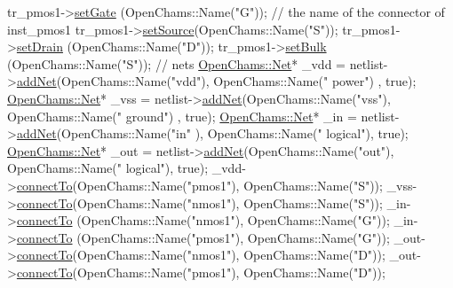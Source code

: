 \begin{DoxyCodeInclude}
    tr\_pmos1->\hyperlink{class_open_chams_1_1_transistor_a705b53a51f0e265533b228f6e8beaf50}{setGate}  (OpenChams::Name(\textcolor{stringliteral}{"G"})); \textcolor{comment}{// the name of the connector of inst\_pmos1}
    tr\_pmos1->\hyperlink{class_open_chams_1_1_transistor_abc4a5d86e639ea13e27551722e2f9c17}{setSource}(OpenChams::Name(\textcolor{stringliteral}{"S"}));
    tr\_pmos1->\hyperlink{class_open_chams_1_1_transistor_a72ff8491040e3fdc1c8bd62b2392ab82}{setDrain} (OpenChams::Name(\textcolor{stringliteral}{"D"}));
    tr\_pmos1->\hyperlink{class_open_chams_1_1_transistor_a1484abe63e3f8ffbc2911c5230fa7091}{setBulk}  (OpenChams::Name(\textcolor{stringliteral}{"S"}));
    \textcolor{comment}{//  nets}
    \hyperlink{class_open_chams_1_1_net}{OpenChams::Net}* \_vdd = netlist->\hyperlink{class_open_chams_1_1_netlist_a52be455a704925328843770552eca43d}{addNet}(OpenChams::Name(\textcolor{stringliteral}{"vdd"}), OpenChams::Name(\textcolor{stringliteral}{"
      power"})  , \textcolor{keyword}{true});
    \hyperlink{class_open_chams_1_1_net}{OpenChams::Net}* \_vss = netlist->\hyperlink{class_open_chams_1_1_netlist_a52be455a704925328843770552eca43d}{addNet}(OpenChams::Name(\textcolor{stringliteral}{"vss"}), OpenChams::Name(\textcolor{stringliteral}{"
      ground"}) , \textcolor{keyword}{true});
    \hyperlink{class_open_chams_1_1_net}{OpenChams::Net}* \_in  = netlist->\hyperlink{class_open_chams_1_1_netlist_a52be455a704925328843770552eca43d}{addNet}(OpenChams::Name(\textcolor{stringliteral}{"in"} ), OpenChams::Name(\textcolor{stringliteral}{"
      logical"}), \textcolor{keyword}{true});
    \hyperlink{class_open_chams_1_1_net}{OpenChams::Net}* \_out = netlist->\hyperlink{class_open_chams_1_1_netlist_a52be455a704925328843770552eca43d}{addNet}(OpenChams::Name(\textcolor{stringliteral}{"out"}), OpenChams::Name(\textcolor{stringliteral}{"
      logical"}), \textcolor{keyword}{true});
    \_vdd->\hyperlink{class_open_chams_1_1_net_a40c2c019175ba3bfa4b90f4ad5d06483}{connectTo}(OpenChams::Name(\textcolor{stringliteral}{"pmos1"}), OpenChams::Name(\textcolor{stringliteral}{"S"}));
    \_vss->\hyperlink{class_open_chams_1_1_net_a40c2c019175ba3bfa4b90f4ad5d06483}{connectTo}(OpenChams::Name(\textcolor{stringliteral}{"nmos1"}), OpenChams::Name(\textcolor{stringliteral}{"S"}));
    \_in->\hyperlink{class_open_chams_1_1_net_a40c2c019175ba3bfa4b90f4ad5d06483}{connectTo} (OpenChams::Name(\textcolor{stringliteral}{"nmos1"}), OpenChams::Name(\textcolor{stringliteral}{"G"}));
    \_in->\hyperlink{class_open_chams_1_1_net_a40c2c019175ba3bfa4b90f4ad5d06483}{connectTo} (OpenChams::Name(\textcolor{stringliteral}{"pmos1"}), OpenChams::Name(\textcolor{stringliteral}{"G"}));
    \_out->\hyperlink{class_open_chams_1_1_net_a40c2c019175ba3bfa4b90f4ad5d06483}{connectTo}(OpenChams::Name(\textcolor{stringliteral}{"nmos1"}), OpenChams::Name(\textcolor{stringliteral}{"D"}));
    \_out->\hyperlink{class_open_chams_1_1_net_a40c2c019175ba3bfa4b90f4ad5d06483}{connectTo}(OpenChams::Name(\textcolor{stringliteral}{"pmos1"}), OpenChams::Name(\textcolor{stringliteral}{"D"}));


\end{DoxyCodeInclude}
